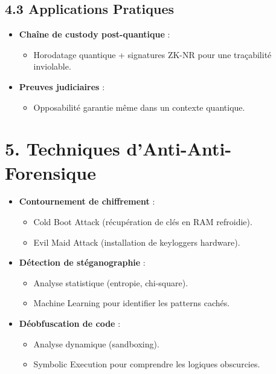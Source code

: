 \documentclass[12pt, a4paper]{report}
\begin{document}
\subsection*{4.3 Applications Pratiques}
\begin{itemize}
    \item \textbf{Chaîne de custody post-quantique} :
    \begin{itemize}
        \item Horodatage quantique + signatures ZK-NR pour une traçabilité inviolable.
    \end{itemize}
    \item \textbf{Preuves judiciaires} :
    \begin{itemize}
        \item Opposabilité garantie même dans un contexte quantique.
    \end{itemize}
\end{itemize}

\section*{5. Techniques d’Anti-Anti-Forensique}
\begin{itemize}
    \item \textbf{Contournement de chiffrement} :
    \begin{itemize}
        \item Cold Boot Attack (récupération de clés en RAM refroidie).
        \item Evil Maid Attack (installation de keyloggers hardware).
    \end{itemize}
    \item \textbf{Détection de stéganographie} :
    \begin{itemize}
        \item Analyse statistique (entropie, chi-square).
        \item Machine Learning pour identifier les patterns cachés.
    \end{itemize}
    \item \textbf{Déobfuscation de code} :
    \begin{itemize}
        \item Analyse dynamique (sandboxing).
        \item Symbolic Execution pour comprendre les logiques obscurcies.
    \end{itemize}
\end{itemize}
\end{document}
